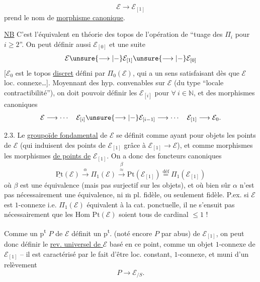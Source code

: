 

\[
\mathcal E\longrightarrow\mathcal E_{[1]}
\]
prend le nom de \uline{morphisme canonique}.

\uline{NB} C'est l'équivalent en théorie des topos de l'opération de ``tuage des $\Pi_i$ pour $i\geq 2$''. On peut définir aussi   $\mathcal E_{[0]}$ et une suite
\[
\mathcal E\unsure{\longrightarrow|-}\mathcal E_{[1]}\unsure{\longrightarrow|-}\mathcal E_{[0]}
\]
[$\mathcal E_0$ est le topos \uline{discret} défini par $\Pi_0(\mathcal E)$, qui a un sens satisfaisant dès que $\mathcal E$ loc. connexe\dots]. Moyennant des hyp. convenables sur $\mathcal E$ (du type ``locale contractibilité''), on doit pouvoir définir les $\mathcal E_{[i]}$ pour $\forall\ i\in\mathbb N$, et des morphismes canoniques
\[
\mathcal E\longrightarrow\cdots\quad
\mathcal E_{[i]}\unsure{\longrightarrow|-}\mathcal E_{[i-1]}\longrightarrow\cdots\quad
\mathcal E_{[1]}\longrightarrow\mathcal E_0.
\]



2.3. Le \uline{groupoïde fondamental} de $\mathcal E$ se définit comme ayant pour objets les points de $\mathcal E$ (qui induisent des points de $\mathcal E_{[1]}$ grâce à $\mathcal E_{[1]}\longrightarrow\mathcal E$), et comme morphismes les  morphismes \uline{de points de} $\mathcal E_{[1]}$. On a donc des foncteurs canoniques
\[
\underline{\mathrm{Pt}}(\mathcal E)
\xrightarrow{\alpha}\Pi_1(\mathcal E)
\overset{\beta}{\overset{\approx}{\longrightarrow}}
\mathrm{Pt}(\mathcal E_{[1]})
\overset{\text{déf}}{=}\Pi_1(\mathcal E_{[1]})
\]
où $\beta$ est une équivalence (mais pas surjectif sur les objets), et où bien sûr $\alpha$ n'est pas nécessairement une équivalence, ni $\overline{\mathrm m}$ pl. fidèle, ou seulement fidèle. P.ex. si $\mathcal E$ est $1$-connexe i.e. $\Pi_1(\mathcal E)$ équivalent à la cat. ponctuelle, il ne s'ensuit pas nécessairement que les Hom  $\mathrm{Pt}(\mathcal E)$ soient tous de cardinal $\leq 1$ !



Comme un p\textsuperscript{t} $P$ de $\mathcal E$ définit un p\textsuperscript{t}. (noté encore $P$ par abus) de $\mathcal E_{[1]}$, on peut donc définir le \uline{rev. universel de $\mathcal E$} basé en ce point, comme un objet  $1$-connexe de $\mathcal E_{[1]}$ -- il est caractérisé  par le fait d'être loc. constant, $1$-connexe, et muni d'un relèvement
\[
P\longrightarrow\mathcal E_{/S}.
\]

